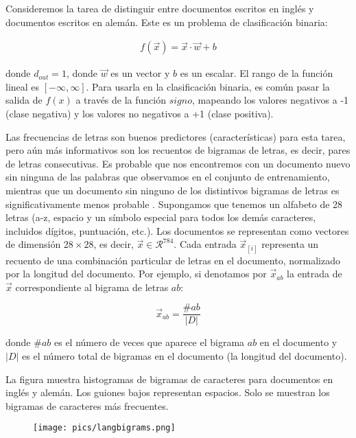 Consideremos la tarea de distinguir entre documentos escritos en inglés y documentos escritos en alemán. Este es un problema de clasificación binaria:

\begin{equation}
\begin{split}
f(\vec{x}) = \vec{x} \cdot \vec{w} + b
\end{split}
\end{equation}

donde $d_{out} = 1$, donde $\vec{w}$ es un vector y $b$ es un escalar. El rango de la función lineal es $[-\infty, \infty]$. Para usarla en la clasificación binaria, es común pasar la salida de $f(x)$ a través de la función $signo$, mapeando los valores negativos a -1 (clase negativa) y los valores no negativos a +1 (clase positiva).

Las frecuencias de letras son buenos predictores (características) para esta tarea, pero aún más informativos son los recuentos de bigramas de letras, es decir, pares de letras consecutivas. Es probable que nos encontremos con un documento nuevo sin ninguna de las palabras que observamos en el conjunto de entrenamiento, mientras que un documento sin ninguno de los distintivos bigramas de letras es significativamente menos probable \cite{goldberg2017neural}. Supongamos que tenemos un alfabeto de 28 letras (a-z, espacio y un símbolo especial para todos los demás caracteres, incluidos dígitos, puntuación, etc.). Los documentos se representan como vectores de dimensión $28 \times 28$, es decir, $\vec{x} \in \mathcal{R}^{784}$. Cada entrada $\vec{x}_{[i]}$ representa un recuento de una combinación particular de letras en el documento, normalizado por la longitud del documento. Por ejemplo, si denotamos por $\vec{x}_{ab}$ la entrada de $\vec{x}$ correspondiente al bigrama de letras $ab$:

\begin{equation}
\vec{x}_{ab} = \frac{\#ab}{|D|}
\end{equation}

donde $\#ab$ es el número de veces que aparece el bigrama $ab$ en el documento y $|D|$ es el número total de bigramas en el documento (la longitud del documento).

La figura muestra histogramas de bigramas de caracteres para documentos en inglés y alemán. Los guiones bajos representan espacios. Solo se muestran los bigramas de caracteres más frecuentes.

\begin{figure}[htb]
	\centering
	 \texttt{[image: pics/langbigrams.png]}
\end{figure}

